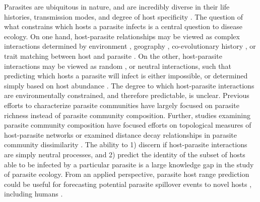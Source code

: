 \documentclass[12pt]{article}
\begin{document}
Parasites are ubiquitous in nature, and are incredibly diverse in their life histories, transmission modes, and degree of host specificity \citep{poulin2011}. The question of what constrains which hosts a parasite infects is a central question to disease ecology. On one hand, host-parasite relationships may be viewed as complex interactions determined by environment \citep{locke2013}, geography \cite{nieberding2008}, co-evolutionary history \cite{krasnov2012}, or trait matching between host and parasite \cite{rohr2013}. On the other, host-parasite interactions may be viewed as random \cite{kennedy2009}, or neutral interactions, such that predicting which hosts a parasite will infect is either impossible, or determined simply based on host abundance \cite{canard2014}. The degree to which host-parasite interactions are environmentally constrained, and therefore predictable, is unclear. Previous efforts to characterize parasite communities have largely focused on parasite richness \citep{arneberg2002,nunn2003,ezenwa2006,poulin1997} instead of parasite community composition. Further, studies examining parasite community composition have focused efforts on topological measures of host-parasite networks \citep{guegan1994, canard2014, krasnov2012, poulin2010} or examined distance decay relationships in parasite community dissimilarity \citep{locke2012, locke2013, poulin2003}. The ability to 1) discern if host-parasite interactions are simply neutral processes, and 2) predict the identity of the subset of hosts able to be infected by a particular parasite is a large knowledge gap in the study of parasite ecology. From an applied perspective, parasite host range prediction could be useful for forecasting potential parasite spillover events to novel hosts \cite{colautti2004}, including humans \cite{daszak2000}. \\


\end{document}
